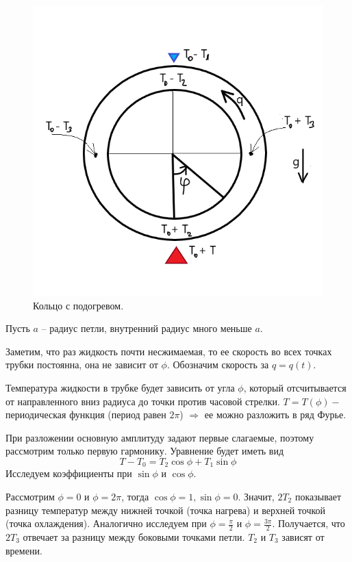 \documentclass[12pt]{article}
\begin{document}
\begin{figure}[h]
	\centering
 	\includegraphics[scale=0.365]{Lorenz.png}
 	\caption{Кольцо с подогревом.}
\end{figure}

Пусть $a$ -- радиус петли, внутренний радиус много меньше $a$.

Заметим, что раз жидкость почти несжимаемая, то ее скорость во всех точках трубки постоянна, она не зависит от $\phi$. Обозначим скорость за $q = q(t)$.

Температура жидкости в трубке будет зависить от угла $\phi$, который отсчитывается от направленного вниз радиуса до точки против часовой стрелки. $T = T(\phi) -$ периодическая функция (период равен $2\pi$) $\Rightarrow$ ее можно разложить в ряд Фурье.

При разложении основную амплитуду задают первые слагаемые, поэтому рассмотрим только первую гармонику. Уравнение будет иметь вид 
\begin{equation}\label{eq1}
T - T_0 = T_2\cos\phi + T_1\sin\phi
\end{equation}
Исследуем коэффициенты при $\sin\phi$ и $\cos\phi$.

Рассмотрим $\phi = 0$ и $\phi = 2 \pi$, тогда $\cos\phi = 1, \sin\phi = 0$. Значит, $2T_2$ показывает разницу температур между нижней точкой (точка нагрева) и верхней точкой (точка охлаждения). Аналогично исследуем при $\phi = \frac{\pi}{2}$ и $\phi = \frac{3 \pi}{2}$. Получается, что $2T_3$ отвечает за разницу между боковыми точками петли. $T_2$ и $T_3$ зависят от времени.
\end{document}
